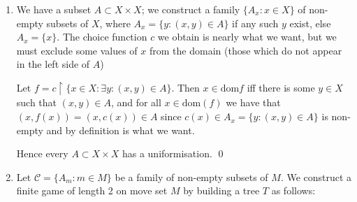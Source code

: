 \documentclass[]{article}
\newcommand{\om}{\omega}
\renewcommand{\ac}{\textrm{AC}}
\newcommand{\dom}{\textrm{dom}}
\begin{document}
\begin{enumerate}[label = (\arabic*)]
    By Cantor-Schroder-Bernstein there exists a bijection $g: \mathcal{P}\Q \ra \R$. Define $$A_y = \{g(S):S\subset\Q\textrm{ has order type }\alpha_y\}$$ and use $\ac_\omega(\R)$ to obtain a collection $\{r_y:y\in \N\}$ such that $g^{-1}(r_y)\coloneqq S_y$ has order type $\alpha_y$. We remark that each $A_y$ is non-empty since it can be shown without AC that every ordinal can be embedded into $\Q$.

    We then `squish' $S_y$ into the interval $[y,y+1)$ via the map $$s\mapsto y + 1 - 1/(s + 1 - \min S_y)$$ which is order-preserving (the order is flipped once by $x\mapsto 1/x$, and then again by negation). Call this new set $T_y$.

    Then let $ S = \bigcup_{y\in\om} T_y$. $S$ is well-ordered since infinite decreasing sequences must get stuck in some least interval $[n,n+1)$, and thereafter would form a decreasing sequence in a well-ordered set.

    As a result of this, we can see that $S$ is countable without using $\ac$; simply well-order the rationals (which we can do without choice) and for each $s\in S$ pick the least rational under this order in the interval $(s,s^+)$. This defines a clear injection $S\xhookrightarrow[]{} \Q$, so $S$ is countable and hence has countable order type $\beta$.

    But $T_y \subset S$ for all $y$, so $\alpha_y \le \beta$ for all $y$. But $(\alpha_y)$ is an unbounded sequence, so $\beta \ge \omega_1$. So $\beta$ is uncountable. Contradiction. \qed

    \item We have a subset $A\subset X\times X$; we construct a family $\{A_x:x\in X\}$ of non-empty subsets of $X$, where $A_x = \{y: (x,y)\in A\}$ if any such $y$ exist, else $A_x = \{x\}$. The choice function $c$ we obtain is nearly what we want, but we must exclude some values of $x$ from the domain (those which do not appear in the left side of $A$)
    
    Let $f = c\restriction \{x\in X:\exists y: (x,y)\in A\}$. Then $x \in \dom f$ iff there is some $y \in X$ such that $(x,y) \in A$, and for all $x \in \dom(f)$ we have that $(x,f(x)) = (x,c(x)) \in A$ since $c(x) \in A_x = \{y:(x,y)\in A\}$ is non-empty and by definition is what we want.

    Hence every $A\subset X\times X$ has a uniformisation. \qed

    \item Let $\mathcal{C} = \{A_m:m\in M\}$ be a family of non-empty subsets of $M$. We construct a finite game of length 2 on move set $M$ by building a tree $T$ as follows:
    

\end{enumerate}
\end{document}
